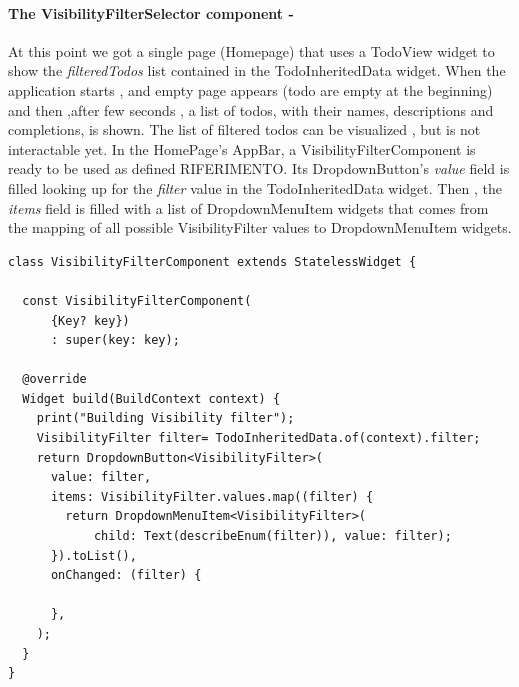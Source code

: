 \paragraph{The VisibilityFilterSelector component - }
\label{subpar:todo_app_inherited_widget_visibilityfiltercomponent_component}
At this point we got a single page (Homepage) that uses a TodoView widget to show the \textit{filteredTodos} list contained in the TodoInheritedData widget. When the application starts , and empty page appears (todo are empty at the beginning) and then ,after few seconds , a list of todos, with their names, descriptions and completions, is shown. The list of filtered todos can be visualized , but is not interactable yet. 
In the HomePage’s AppBar, a VisibilityFilterComponent is ready to be used as defined RIFERIMENTO. Its DropdownButton’s \textit{value} field is filled looking up for the \textit{filter} value in the TodoInheritedData widget. Then , the \textit{items} field is filled with a list of DropdownMenuItem widgets that comes from the mapping of all possible VisibilityFilter values to DropdownMenuItem widgets.
\mbox{}\\
\begin{code}

 \mbox{}

\label{code:2.22}
\begin{verbatim}
class VisibilityFilterComponent extends StatelessWidget {

  const VisibilityFilterComponent(
      {Key? key})
      : super(key: key);

  @override
  Widget build(BuildContext context) {
    print("Building Visibility filter");
    VisibilityFilter filter= TodoInheritedData.of(context).filter;
    return DropdownButton<VisibilityFilter>(
      value: filter,
      items: VisibilityFilter.values.map((filter) {
        return DropdownMenuItem<VisibilityFilter>(
            child: Text(describeEnum(filter)), value: filter);
      }).toList(),
      onChanged: (filter) {
        
      },
    );
  }
}
\end{verbatim}
\end{code}
\mbox{}\\
